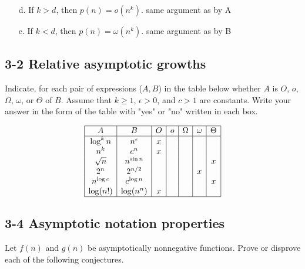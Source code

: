 \documentclass{article}
\theoremstyle{definition}
\begin{document}
\begin{enumerate}
\begin{proof}
        Since \( k = d \), we have \( n^d = n^k \). Therefore:
        \[ p(n) = a_d n^k + \sum_{i=0}^{d-1} a_i n^i \] 

        thus 
        \[ a_d n^k + \sum_{i=0}^{d-1} a_i n^i \leq (a_d + \sum_{i=0}^{d-1} a_i)  n^k = c_1 * n^k\]
        this implies \[p(n) \leq c_1 * n^k \forall n \geq n_0\] and thus \[
        p(n) = \omega(n^k)\]
        and by the same argument
        \[ a_d n^k + \sum_{i=0}^{d-1} a_i n^i \geq (a_d + \sum_{i=0}^{d-1} |a_i|)  n^k = c_2 * n^k\] this implies \[p(n) \geq c_2 * n^k \forall n \geq n_0\] and thus \[
        p(n) = O(n^k)\]
        
        \[p(n) = O(n^k) = \Omega(n^k) \implies p(n) = \Theta(n^k)\] 


    \end{proof}
    
    \item[d.] If \( k > d \), then \( p(n) = o(n^k) \).
    same argument as by A
    \item[e.] If \( k < d \), then \( p(n) = \omega(n^k) \).
    same argument as by B
\end{enumerate}

\subsection{3-2 Relative asymptotic growths}
Indicate, for each pair of expressions (\( A, B \)) in the table below whether \( A \) is \( O \), \( o \), \( \Omega \), \( \omega \), or \( \Theta \) of \( B \). Assume that \( k \geq 1 \), \( \epsilon > 0 \), and \( c > 1 \) are constants. Write your answer in the form of the table with "yes" or "no" written in each box.

\[
\begin{array}{|c|c|c|c|c|c|c|}
\hline
A & B & O & o & \Omega & \omega & \Theta \\
\hline
\log^k n & n^\epsilon & x &   &  &  &  \\
n^k & c^n & x &  &  &  &  \\
\sqrt{n} & n^{\sin n} &  &  &  &  &  x\\
2^n & 2^{n/2} &  &  &  & x &  \\
n^{\log c} & c^{\log n} &  &  &  &  & x \\
\log(n!) & \log(n^n) &  x &  &  &  &  \\
\hline
\end{array}
\]

\subsection{3-4 Asymptotic notation properties}
Let \( f(n) \) and \( g(n) \) be asymptotically nonnegative functions. Prove or disprove each of the following conjectures.
\end{document}
